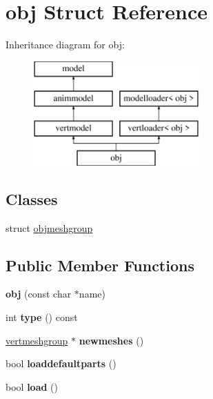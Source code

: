 \hypertarget{structobj}{}\section{obj Struct Reference}
\label{structobj}
Inheritance diagram for obj\+:\begin{figure}[H]
\begin{center}
\leavevmode
\includegraphics[height=4.000000cm]{structobj}
\end{center}
\end{figure}
\subsection*{Classes}
\begin{DoxyCompactItemize}
\item 
struct \hyperlink{structobj_1_1objmeshgroup}{objmeshgroup}
\end{DoxyCompactItemize}
\subsection*{Public Member Functions}
\begin{DoxyCompactItemize}
\item 
\mbox{\label{structobj_aea108f10c4fe1b5e1fc2148abfc7b09c}} 
{\bfseries obj} (const char $\ast$name)
\item 
\mbox{\label{structobj_a757c6edc5012933a26d9a46af338c8c8}} 
int {\bfseries type} () const
\item 
\mbox{\label{structobj_adf62f4dadc58ef2198f77f73d0a15c76}} 
\hyperlink{structvertmodel_1_1vertmeshgroup}{vertmeshgroup} $\ast$ {\bfseries newmeshes} ()
\item 
\mbox{\label{structobj_a8ac5fd0c41ae87dcedd702a859523a8d}} 
bool {\bfseries loaddefaultparts} ()
\item 
\mbox{\label{structobj_a68e4a61840827180291b39b9156b3e79}} 
bool {\bfseries load} ()
\end{DoxyCompactItemize}
